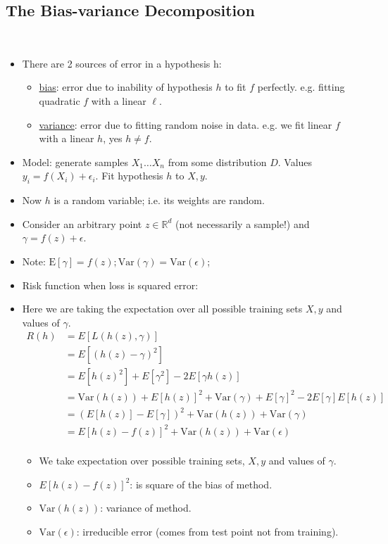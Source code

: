 \documentclass[10pt]{article}
\begin{document}
	\subsection*{The Bias-variance Decomposition}
	\
	\begin{itemize}
		\item There are 2 sources of error in a hypothesis h:
			\begin{itemize}
				\item \underline{bias}: error due to inability of hypothesis $h$ to fit $f$ perfectly. e.g. fitting quadratic $f$ with a linear $\ell$.
				\item \underline{variance}: error due to fitting random noise in data. e.g. we fit linear $f$ with a linear $h$, yes $h \neq f$.
			\end{itemize}
		\item Model: generate samples $X_{1} \dots X_{n}$ from some distribution $D$. Values $y_{i} = f(X_{i}) + \epsilon_{i}$. Fit hypothesis $h$ to $X, y$.
		\item Now $h$ is a random variable; i.e. its weights are random.
		\item Consider an arbitrary point $z \in \mathbb{R}^{d}$ (not necessarily a sample!) and $\gamma = f(z) + \epsilon$.
		\item Note: $\text{E}[\gamma] = f(z) ; \text{Var}(\gamma) = \text{Var}(\epsilon)$;
		\item Risk function when loss is squared error:
		\item Here we are taking the expectation over all possible training sets $X,y$ and values of $\gamma$.
			\begin{align*}
				R(h) &= E[L(h(z), \gamma)]\\
					&= E[(h(z) - \gamma)^{2}]\\
					&= E[h(z)^{2}] + E[\gamma^{2}] - 2E[\gamma h(z)]\\
					&= \text{Var}(h(z)) + E[h(z)]^{2} + \text{Var}(\gamma) + E[\gamma]^{2} - 2E[\gamma]E[h(z)]\\
					&= (E[h(z)] - E[\gamma])^{2} + \text{Var}(h(z)) + \text{Var}(\gamma)\\
					&= E[h(z) - f(z)]^{2} + \text{Var}(h(z)) + \text{Var}(\epsilon)\\
			\end{align*}
			\begin{itemize}
				\item We take expectation over possible training sets, $X, y$ and values of $\gamma$.
				\item $E[h(z) - f(z)]^{2}$: is square of the bias of method.
				\item $\text{Var}(h(z))$: variance of method.
				\item $\text{Var}(\epsilon)$: irreducible error (comes from test point not from training).
			\end{itemize}
			

\end{itemize}
\end{document}
